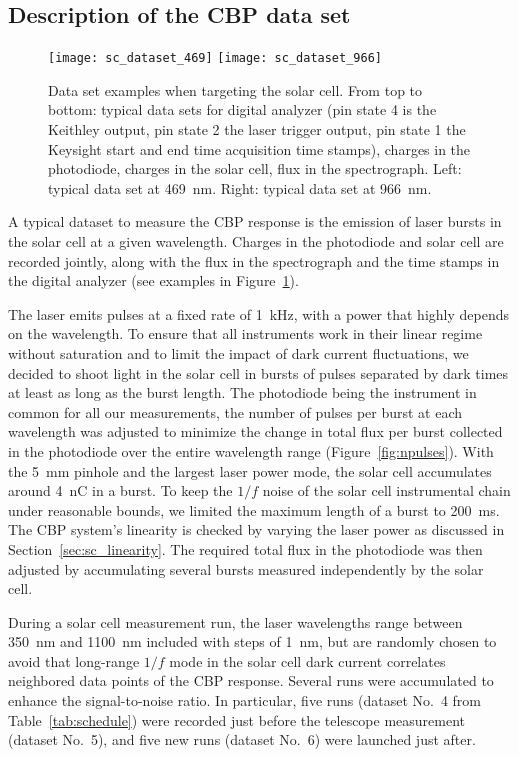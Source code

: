 \subsection{Description of the CBP data set}
\label{sec:cbp_datadesc}

\begin{figure}[!h]
\centering
\texttt{[image: sc\_dataset\_469]}
\texttt{[image: sc\_dataset\_966]}
\caption{Data set examples when targeting the solar cell. From top to bottom: typical data sets for digital analyzer (pin state 4 is the Keithley output, pin state 2 the laser trigger output, pin state 1 the Keysight start and end time acquisition time stamps), charges in the photodiode, charges in the solar cell, flux in the spectrograph. Left: typical data set at \SI{469}{\nm}. Right: typical data set at \SI{966}{\nm}.}\label{fig:sc_dataset_examples}
\end{figure}

A typical dataset to measure the CBP response is the emission of laser bursts in the solar cell at a given wavelength. Charges in the photodiode and solar cell are recorded jointly, along with the flux in the spectrograph and the time stamps in the digital analyzer (see examples in Figure~\ref{fig:sc_dataset_examples}).

The laser emits pulses at a fixed rate of \SI{1}{\kilo\hertz}, with a power that highly depends on the wavelength. To ensure that all instruments work in their linear regime without saturation and to limit the impact of dark current fluctuations, we decided to shoot light in the solar cell in bursts of pulses separated by dark times at least as long as the burst length. The photodiode being the instrument in common for all our measurements, the number of pulses per burst at each wavelength was adjusted to minimize the change in total flux per burst collected in the photodiode over the entire wavelength range (Figure~\ref{fig:npulses}). With the \SI{5}{\mm} pinhole and the largest laser power mode, the solar cell accumulates around \SI{4}{\nano\coulomb} in a burst. To keep the $1/f$ noise of the solar cell instrumental chain under reasonable bounds, we limited the maximum length of a burst to \SI{200}{\ms}. The CBP system's linearity is checked by varying the laser power as discussed in Section~\ref{sec:sc_linearity}.  The required total flux in the photodiode was then adjusted by accumulating several bursts measured independently by the solar cell.

During a solar cell measurement run, the laser wavelengths range between \SI{350}{\nano\meter} and \SI{1100}{\nano\meter} included with steps of \SI{1}{\nm}, but are randomly chosen to avoid that long-range $ 1/f$ mode in the solar cell dark current correlates neighbored data points of the CBP response. Several runs were accumulated to enhance the signal-to-noise ratio. In particular, five runs (dataset No.~4 from Table~\ref{tab:schedule}) were recorded just before the \SD telescope measurement (dataset No.~5), and five new runs (dataset No.~6) were launched just after.

